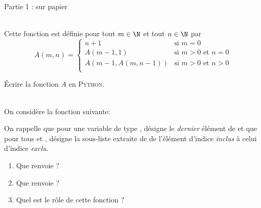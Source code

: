 \documentclass[a4paper,12pt]{article}
\begin{document}

{\color{UGLiBlue}\Huge\titlefont Partie 1 : sur papier\\}

\\

Cette fonction est définie pour tout $m\in\N$ et tout $n\in\N$ par
 $$A(m,n)=\begin{cases}
	n+1 & \mbox{si } m=0\\
	A(m-1,1) &\mbox{si } m>0\mbox{ et } n=0\\
	A(m-1,A(m,n-1)) &\mbox{si } m>0\mbox{ et } n>0\\
\end{cases}$$

\'Ecrire la fonction $A$ en \textsc{Python}.\\

\\


On considère la fonction suivante:

On rappelle que pour une variable  de type ,  désigne le \textit{dernier} élément de  et que pour tous  et ,  désigne la sous-liste extraite de  de
l'élément d'indice  \textit{inclus} à celui d'indice  \textit{exclu}.

\begin{enumerate}[\bfseries 1.]
	\item 	Que renvoie  ?\\

	\item 	Que renvoie  ?\\

    \item   Quel est le rôle de cette fonction ?\\

    \\
\end{enumerate}


\\
\end{document}
